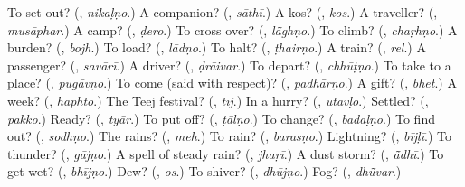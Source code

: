 \begin{tcolorbox}[breakable,colback=teal!4,colframe=teal!35!black,title={Before you move on}]
To set out? (\textbf{}, \emph{nikaḷṇo}.) A companion? (\textbf{}, \emph{sāthī}.) A kos? (\textbf{}, \emph{kos}.) A traveller? (\textbf{}, \emph{musāphar}.) A camp? (\textbf{}, \emph{ḍero}.) To cross over? (\textbf{}, \emph{lā̃ghṇo}.) To climb? (\textbf{}, \emph{chaṛhṇo}.) A burden? (\textbf{}, \emph{bojh}.) To load? (\textbf{}, \emph{lādṇo}.) To halt? (\textbf{}, \emph{ṭhairṇo}.) A train? (\textbf{}, \emph{rel}.) A passenger? (\textbf{}, \emph{savārī}.) A driver? (\textbf{}, \emph{ḍrāivar}.) To depart? (\textbf{}, \emph{chhūṭṇo}.) To take to a place? (\textbf{}, \emph{pugāvṇo}.) To come (said with respect)? (\textbf{}, \emph{padhārṇo}.) A gift? (\textbf{}, \emph{bheṭ}.) A week? (\textbf{}, \emph{haphto}.) The Teej festival? (\textbf{}, \emph{tīj}.) In a hurry? (\textbf{}, \emph{utāvḷo}.) Settled? (\textbf{}, \emph{pakko}.) Ready? (\textbf{}, \emph{tyār}.) To put off? (\textbf{}, \emph{ṭālṇo}.) To change? (\textbf{}, \emph{badaḷṇo}.) To find out? (\textbf{}, \emph{sodhṇo}.) The rains? (\textbf{}, \emph{meh}.) To rain? (\textbf{}, \emph{barasṇo}.) Lightning? (\textbf{}, \emph{bījḷī}.) To thunder? (\textbf{}, \emph{gājṇo}.) A spell of steady rain? (\textbf{}, \emph{jhaṛī}.) A dust storm? (\textbf{}, \emph{ā̃dhī}.) To get wet? (\textbf{}, \emph{bhījṇo}.) Dew? (\textbf{}, \emph{os}.) To shiver? (\textbf{}, \emph{dhūjṇo}.) Fog? (\textbf{}, \emph{dhū̃var}.)
\end{tcolorbox}
